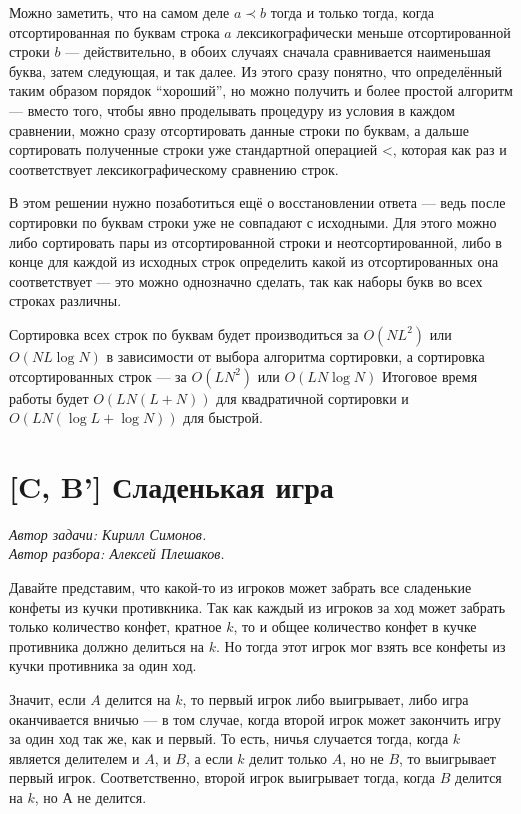 \documentclass[12pt]{article}
\theoremstyle{definition}
\begin{document}
Можно заметить, что на самом деле $a \prec b$ тогда и только тогда, когда отсортированная по буквам строка $a$ лексикографически меньше отсортированной строки $b$ --- действительно,
в обоих случаях сначала сравнивается наименьшая буква, затем следующая, и так далее. Из этого сразу понятно, что определённый таким образом порядок ``хороший'', но можно получить и более простой алгоритм --- вместо того, чтобы явно проделывать процедуру из условия в каждом сравнении, можно сразу отсортировать данные строки по буквам,
а дальше сортировать полученные строки уже стандартной операцией <, которая как раз и соответствует лексикографическому сравнению строк. 

В этом решении нужно позаботиться ещё о восстановлении ответа --- ведь после сортировки по буквам строки уже не совпадают с исходными. Для этого можно либо сортировать
пары из отсортированной строки и неотсортированной, либо в конце для каждой из исходных строк определить какой из отсортированных она соответствует --- это можно однозначно сделать,
так как наборы букв во всех строках различны.

Сортировка всех строк по буквам будет производиться за $O(NL^2)$ или $O(NL \log N)$ в зависимости от выбора алгоритма сортировки, а сортировка отсортированных строк --- за
$O(LN^2)$ или $O(L N \log N)$
Итоговое время работы будет $O(LN(L + N))$ для квадратичной сортировки и $O(LN(\log L + \log N))$ для быстрой.

\section{[C, B'] Сладенькая игра}
\textit{Автор задачи: Кирилл Симонов.} \\
\textit{Автор разбора: Алексей Плешаков.}

Давайте представим, что какой-то из игроков может забрать все сладенькие конфеты из кучки противкника. Так как каждый из игроков за ход может забрать только количество конфет, кратное $k$, то и общее количество конфет в кучке противника должно делиться на $k$.
Но тогда этот игрок мог взять все конфеты из кучки противника за один ход.

Значит, если $A$ делится на $k$, то первый игрок либо выигрывает, либо игра оканчивается вничью --- в том случае,
когда второй игрок может закончить игру за один ход так же, как и первый. То есть, ничья случается тогда, когда $k$
является делителем и $A$, и $B$, а если $k$ делит только $A$, но не $B$, то выигрывает первый игрок. Соответственно, второй игрок выигрывает тогда, когда $B$ делится на $k$, но А не делится.
\end{document}
